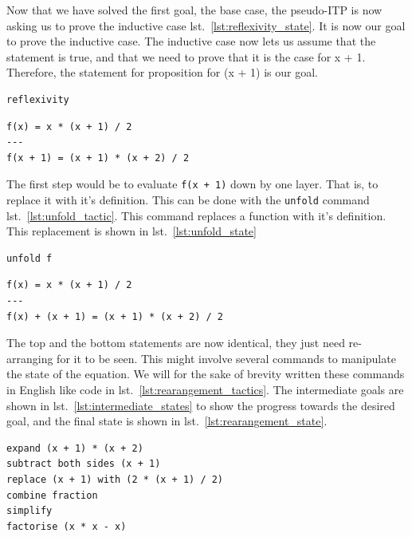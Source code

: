 \documentclass[
]{article}
\begin{document}
Now that we have solved the first goal, the base case, the pseudo-ITP is
now asking us to prove the inductive case
lst.~\ref{lst:reflexivity_state}. It is now our goal to prove the
inductive case. The inductive case now lets us assume that the statement
is true, and that we need to prove that it is the case for x + 1.
Therefore, the statement for proposition for (x + 1) is our goal.

\hypertarget{lst:reflexivity_tactic}{%
\label{lst:reflexivity_tactic}}%
\begin{verbatim}
reflexivity
\end{verbatim}

\hypertarget{lst:reflexivity_state}{%
\label{lst:reflexivity_state}}%
\begin{verbatim}
f(x) = x * (x + 1) / 2
---
f(x + 1) = (x + 1) * (x + 2) / 2
\end{verbatim}

The first step would be to evaluate \texttt{f(x\ +\ 1)} down by one
layer. That is, to replace it with it's definition. This can be done
with the \texttt{unfold} command lst.~\ref{lst:unfold_tactic}. This
command replaces a function with it's definition. This replacement is
shown in lst.~\ref{lst:unfold_state}

\hypertarget{lst:unfold_tactic}{%
\label{lst:unfold_tactic}}%
\begin{verbatim}
unfold f
\end{verbatim}

\hypertarget{lst:unfold_state}{%
\label{lst:unfold_state}}%
\begin{verbatim}
f(x) = x * (x + 1) / 2
---
f(x) + (x + 1) = (x + 1) * (x + 2) / 2
\end{verbatim}

The top and the bottom statements are now identical, they just need
re-arranging for it to be seen. This might involve several commands to
manipulate the state of the equation. We will for the sake of brevity
written these commands in English like code in
lst.~\ref{lst:rearangement_tactics}. The intermediate goals are shown in
lst.~\ref{lst:intermediate_states} to show the progress towards the
desired goal, and the final state is shown in
lst.~\ref{lst:rearangement_state}.

\hypertarget{lst:rearangement_tactics}{%
\label{lst:rearangement_tactics}}%
\begin{verbatim}
expand (x + 1) * (x + 2)
subtract both sides (x + 1)
replace (x + 1) with (2 * (x + 1) / 2)
combine fraction
simplify
factorise (x * x - x)
\end{verbatim}
\end{document}
